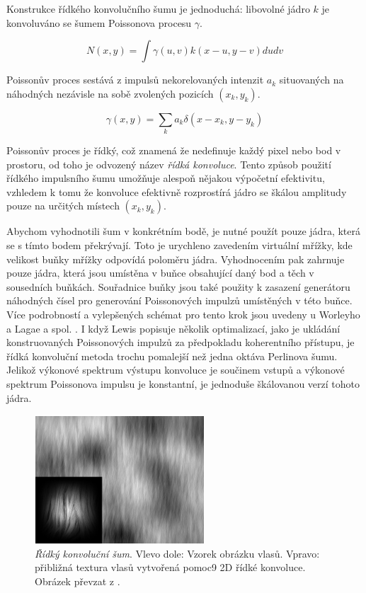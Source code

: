 Konstrukce řídkého konvolučního šumu je jednoduchá: libovolné jádro $k$ je konvoluváno se šumem Poissonova procesu $\gamma$.

\[N(x,y) = \int\gamma(u,v)k(x-u,y-v)dudv\]

Poissonův proces sestává z impulsů nekorelovaných intenzit $a_k$ situovaných na náhodných nezávisle na sobě zvolených pozicích $(x_k,y_k)$.

\[\gamma(x,y) = \sum_k a_k \delta(x-x_k,y-y_k)\]

Poissonův proces je řídký, což znamená že nedefinuje každý pixel nebo bod v prostoru, od toho je odvozený název \textit{řídká konvoluce}. Tento způsob použití řídkého impulsního šumu umožňuje alespoň nějakou výpočetní efektivitu, vzhledem k tomu že konvoluce efektivně rozprostírá jádro se škálou amplitudy pouze na určitých místech $(x_k, y_k)$.

Abychom vyhodnotili šum v konkrétním bodě, je nutné použít pouze jádra, která se s tímto bodem překrývají. Toto je urychleno zavedením virtuální mřížky, kde velikost buňky mřížky odpovídá poloměru jádra. Vyhodnocením pak zahrnuje pouze jádra, která jsou umístěna v buňce obsahující daný bod a těch v sousedních buňkách. Souřadnice buňky jsou také použity k zasazení generátoru náhodných čísel pro generování Poissonových impulzů umístěných v této buňce. Více podrobností a vylepšených schémat pro tento krok jsou uvedeny u Worleyho \cite{worley1996} a Lagae a spol. \cite{Lagae09}. I když Lewis \cite{Lewis89} popisuje několik optimalizací, jako je ukládání konstruovaných Poissonových impulzů za předpokladu koherentního přístupu, je řídká konvoluční metoda trochu pomalejší než jedna oktáva Perlinova šumu. Jelikož výkonové spektrum výstupu konvoluce je součinem vstupů a výkonové spektrum Poissonova impulsu je konstantní, je jednoduše škálovanou verzí tohoto jádra.

\begin{figure}[H]
	\centering
	\includegraphics[scale=1]{obrazky-figures/SparseConvolutionNoise.png}
	\caption{\textit{Řídký konvoluční šum}. Vlevo dole: Vzorek obrázku vlasů. Vpravo: přibližná textura vlasů vytvořená pomoc9 2D řídké konvoluce. Obrázek převzat z \cite{Lagae10}.}
	\label{fig:SparseConvolutionNoise}
\end{figure}

